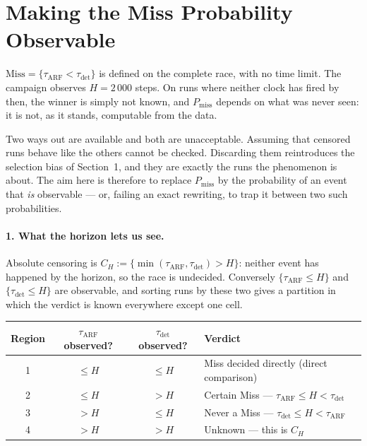 \documentclass[11pt,a4paper]{article}
\begin{document}
\begin{center}
\end{center}

\section{Making the Miss Probability Observable}

$\mathrm{Miss} = \{\tau_{\mathrm{ARF}} < \tau_{\mathrm{det}}\}$ is defined on the complete
race, with no time limit. The campaign observes $H = 2\,000$ steps. On runs where neither
clock has fired by then, the winner is simply not known, and $P_{\mathrm{miss}}$ depends
on what was never seen: it is not, as it stands, computable from the data.

Two ways out are available and both are unacceptable. Assuming that censored runs behave
like the others cannot be checked. Discarding them reintroduces the selection bias of
Section~1, and they are exactly the runs the phenomenon is about. The aim here is
therefore to replace $P_{\mathrm{miss}}$ by the probability of an event that \emph{is}
observable --- or, failing an exact rewriting, to trap it between two such probabilities.

\paragraph{1. What the horizon lets us see.} Absolute censoring is
$C_H := \{\min(\tau_{\mathrm{ARF}},\tau_{\mathrm{det}}) > H\}$: neither event has happened
by the horizon, so the race is undecided. Conversely $\{\tau_{\mathrm{ARF}} \le H\}$ and
$\{\tau_{\mathrm{det}} \le H\}$ are observable, and sorting runs by these two gives a
partition in which the verdict is known everywhere except one cell.

\begin{center}
\begin{tabular}{cccl}
\toprule
Region & $\tau_{\mathrm{ARF}}$ observed? & $\tau_{\mathrm{det}}$ observed? & Verdict \\
\midrule
1 & $\le H$ & $\le H$ & Miss decided directly (direct comparison) \\
2 & $\le H$ & $> H$ & Certain Miss --- $\tau_{\mathrm{ARF}} \le H < \tau_{\mathrm{det}}$ \\
3 & $> H$ & $\le H$ & Never a Miss --- $\tau_{\mathrm{det}} \le H < \tau_{\mathrm{ARF}}$ \\
4 & $> H$ & $> H$ & Unknown --- this is $C_H$ \\
\bottomrule
\end{tabular}
\end{center}
\end{document}
